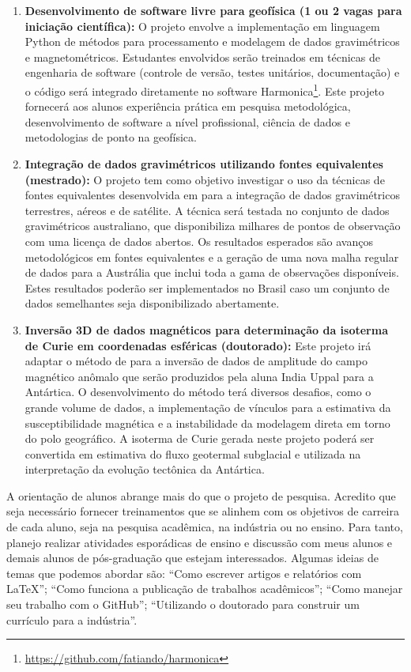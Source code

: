 \documentclass[12pt,a4paper,oneside]{book}
\begin{document}
\begin{enumerate}
  \item \textbf{Desenvolvimento de software livre para geofísica (1 ou 2 vagas
    para iniciação científica):} O projeto envolve a implementação em linguagem
    Python de métodos para processamento e modelagem de dados gravimétricos e
    magnetométricos. Estudantes envolvidos serão treinados em técnicas de
    engenharia de software (controle de versão, testes unitários, documentação)
    e o código será integrado diretamente no software
    Harmonica\footnote{\url{https://github.com/fatiando/harmonica}}.
    Este projeto fornecerá aos alunos experiência prática em pesquisa
    metodológica, desenvolvimento de software a nível profissional, ciência de
    dados e metodologias de ponto na geofísica.
  \item \textbf{Integração de dados gravimétricos utilizando fontes
    equivalentes (mestrado):}
    O projeto tem como objetivo investigar o uso da técnicas de fontes
    equivalentes desenvolvida em \citet{Soler2021} para a integração de dados
    gravimétricos terrestres, aéreos e de satélite. A técnica será testada no
    conjunto de dados gravimétricos australiano, que disponibiliza milhares de
    pontos de observação com uma licença de dados abertos. Os resultados
    esperados são avanços metodológicos em fontes equivalentes e a geração de
    uma nova malha regular de dados para a Austrália que inclui toda a gama de
    observações disponíveis. Estes resultados poderão ser implementados no
    Brasil caso um conjunto de dados semelhantes seja disponibilizado
    abertamente.
  \item \textbf{Inversão 3D de dados magnéticos para determinação da isoterma
    de Curie em coordenadas esféricas (doutorado):}
    Este projeto irá adaptar o método de \citet{Uieda2017} para a inversão de
    dados de amplitude do campo magnético anômalo que serão produzidos pela
    aluna India Uppal para a Antártica. O desenvolvimento do método terá
    diversos desafios, como o grande volume de dados, a implementação de
    vínculos para a estimativa da susceptibilidade magnética e a instabilidade
    da modelagem direta em torno do polo geográfico. A isoterma de Curie gerada
    neste projeto poderá ser convertida em estimativa do fluxo geotermal
    subglacial e utilizada na interpretação da evolução tectônica da Antártica.
\end{enumerate}

A orientação de alunos abrange mais do que o projeto de pesquisa. Acredito que
seja necessário fornecer treinamentos que se alinhem com os objetivos de
carreira de cada aluno, seja na pesquisa acadêmica, na indústria ou no ensino.
Para tanto, planejo realizar atividades esporádicas de ensino e discussão com
meus alunos e demais alunos de pós-graduação que estejam interessados. Algumas
ideias de temas que podemos abordar são: ``Como escrever artigos e relatórios
com \LaTeX''; ``Como funciona a publicação de trabalhos acadêmicos''; ``Como
manejar seu trabalho com o GitHub''; ``Utilizando o doutorado para construir um
currículo para a indústria''.
\end{document}
